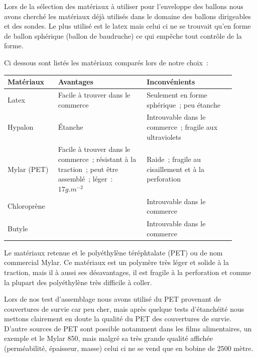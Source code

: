 \documentclass[a4paper,11pt]{article}
\begin{document}
Lors de la sélection des matériaux à utiliser pour l'enveloppe des ballons nous avons cherché les matériaux déjà utilisés dans le domaine des ballons dirigeables et des sondes. Le plus utilisé est le latex mais celui ci ne se trouvait qu'en forme de ballon sphérique (ballon de baudruche) ce qui empêche tout contrôle de la forme.

Ci dessous sont listés les matériaux comparés lors de notre choix~:

\begin{center}
\begin{tabular}{|p{0.2\linewidth}|p{0.35\linewidth}|p{0.35\linewidth}|}
		\hline
		Matériaux & Avantages & Inconvénients \\
		\hline

		\rowcolor{OrangeT}
		Latex &
		Facile à trouver dans le commerce &
		Seulement en forme sphérique~; peu étanche \\
		\hline

		\rowcolor{RedT}
		Hypalon & Étanche & Introuvable dans le commerce~; fragile aux ultraviolets \\
		\hline

		\rowcolor{GreenT}
		Mylar (PET) &
		Facile à trouver dans le commerce~; résistant à la traction~; peut être assemblé~; léger~: $17 g.m^{-2}$ &
		Raide~; fragile au cisaillement et à la perforation \\
		\hline

		\rowcolor{RedT}
		Chloroprène &
		& Introuvable dans le commerce \\
		\hline

		\rowcolor{RedT}
		Butyle &
		& Introuvable dans le commerce \\
		\hline
\end{tabular}
\end{center}

Le matériaux retenue et le polyéthylène téréphtalate (PET) ou de nom commercial Mylar. Ce matériaux est un polymère très léger et solide à la traction, mais il à aussi ses désavantages, il est fragile à la perforation et comme la plupart des polyéthylène très difficile à coller.

Lors de nos test d'assemblage nous avons utilisé du PET provenant de couvertures de survie car peu cher, mais après quelque tests d'étanchéité nous mettons clairement en doute la qualité du PET des couvertures de survie. D'autre sources de PET sont possible notamment dans les films alimentaires, un exemple et le Mylar 850, mais malgré sa très grande qualité affichée (perméabilité, épaisseur, masse) celui ci ne se vend que en bobine de 2500 mètre.
\end{document}
